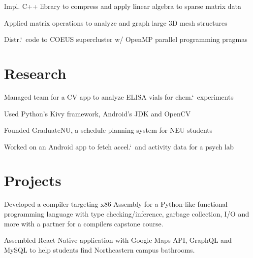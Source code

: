 \documentclass[letterpaper]{resume} %
\begin{document}
\begin{minipage}[t]{0.66\textwidth}

\begin{tightitemize}
  \item Impl. C++ library to compress and apply linear algebra to sparse matrix data
  \item Applied matrix operations to analyze and graph large 3D mesh structures
  \item Distr.`\ code to COEUS supercluster w/ OpenMP parallel programming pragmas
\end{tightitemize}

\section{Research}


\begin{tightitemize}
  \item Managed team for a CV app to analyze ELISA vials for chem.`\ experiments
  \item Used Python's Kivy framework, Android's JDK and OpenCV
  \item Founded GraduateNU, a schedule planning system for NEU students
  \item Worked on an Android app to fetch accel.`\ and activity data for a psych lab
\end{tightitemize}

\section{Projects}

Developed a compiler targeting x86 Assembly for a Python-like
functional programming language with type checking/inference,
garbage collection, I/O and more with a partner for a compilers
capstone course.
\sectionspace

Assembled React Native application with Google Maps API,
GraphQL and MySQL to help students find Northeastern campus bathrooms.
\sectionspace


\end{minipage}
\end{document}
